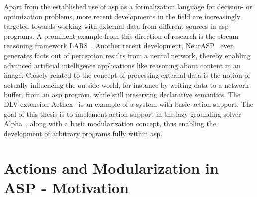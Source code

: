 Apart from the established use of \gls{asp} as a formalization language for decision- or optimization problems, more recent developments in the field are increasingly targeted towards working with external data from different sources in \gls{asp} programs. A prominent example from this direction of research is the stream reasoning framework LARS~\cite{lars}. Another recent development, NeurASP~\cite{neurasp} even generates facts out of perception results from a neural network, thereby enabling advanced artificial intelligence applications like reasoning about content in an image. Closely related to the concept of processing external data is the notion of actually influencing the outside world, for instance by writing data to a network buffer, from an \gls{asp} program, while still preserving declarative semantics. The DLV-extension Acthex~\cite{acthex} is an example of a system with basic action support. The goal of this thesis is to implement action support in the lazy-grounding solver Alpha~\cite{alpha}, along with a basic modularization concept, thus enabling the development of arbitrary programs fully within \gls{asp}.

\section{Actions and Modularization in ASP - Motivation}

